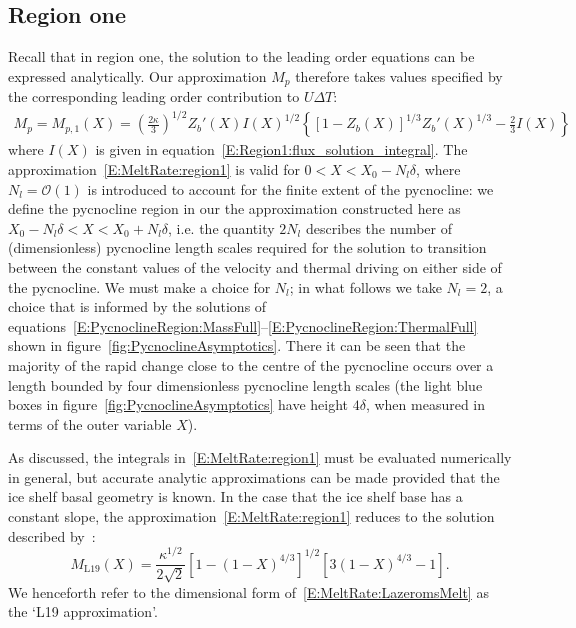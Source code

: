 \documentclass[openacc]{rsproca_new}%
\newcommand{\order}[1]{\mathcal{O}(#1)}
\newcommand{\lt}{\delta} %
\begin{document}
\subsection{Region one}
Recall that in region one, the solution to the leading order equations can be expressed analytically. Our approximation $M_p$ therefore takes values specified by the corresponding leading order contribution to $U\Delta T$:
\begin{multline}\label{E:MeltRate:region1}
M_{p} = M_{p,1}(X) = \left(\frac{2\kappa}{3}\right)^{1/2}Z_b'(X)I(X)^{1/2}\left\{\left[1 - Z_b(X)\right]^{1/3}Z_b'(X)^{1/3} - \frac{2}{3}I(X) \right\} %
\end{multline}
where $I(X)$ is given in equation~\eqref{E:Region1:flux_solution_integral}. The approximation~\eqref{E:MeltRate:region1} is valid for $0 < X < X_0 - N_l \lt $, where $N_l = \order{1}$ is introduced to account for the finite extent of the pycnocline: we define the pycnocline region in our the approximation constructed here as $X_0 - N_l \lt < X < X_0 + N_l \lt$, i.e. the quantity $2 N_l$ describes the number of (dimensionless) pycnocline length scales required for the solution to transition between the constant values of the velocity and thermal driving on either side of the pycnocline.  We must make a choice for $N_l$; in what follows we take $N_l = 2$, a choice that is informed by the solutions of equations~\eqref{E:PycnoclineRegion:MassFull}--\eqref{E:PycnoclineRegion:ThermalFull} shown in figure~\ref{fig:PycnoclineAsymptotics}. There it can be seen that the majority of the rapid change close to the centre of the pycnocline occurs over a length bounded by four dimensionless pycnocline length scales (the light blue boxes in figure~\ref{fig:PycnoclineAsymptotics} have height $4\lt$, when measured in terms of the outer variable $X$).

As discussed, the integrals in~\eqref{E:MeltRate:region1} must be evaluated numerically in general, but accurate analytic approximations can be made provided that the ice shelf basal geometry is known. In the case that the ice shelf base has a constant slope, the approximation~\eqref{E:MeltRate:region1} reduces to the solution described by~\citet{Lazeroms2019JPhysOcean}:
\begin{equation}\label{E:MeltRate:LazeromsMelt}
M_{\text{L19}}(X) = \frac{\kappa^{1/2}}{2\sqrt{2}}\left[1 - (1 - X)^{4/3}\right]^{1/2}\left[3(1-X)^{4/3} - 1\right].
\end{equation}
We henceforth refer to the dimensional form of~\eqref{E:MeltRate:LazeromsMelt} as the `L19 approximation'. 
\end{document}
